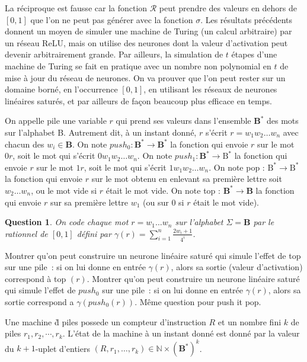 \documentclass[10pt]{article}
\newtheorem{question}{Question}
\begin{document}
La réciproque est fausse car la fonction $\mathcal{R}$ peut prendre des valeurs en dehors de $[0,1]$ que l'on ne peut pas générer avec la fonction $\sigma$. Les résultats précédents donnent un moyen de simuler une machine de Turing (un calcul arbitraire) par un réseau ReLU, mais on utilise des neurones dont la valeur d'activation peut devenir arbitrairement grande. Par ailleurs, la simulation de $t$ étapes d'une machine de Turing se fait en pratique avec un nombre non polynomial en $t$ de mise à jour du réseau de neurones. On va prouver que l'on peut rester sur un domaine borné, en l'occurrence $[0,1]$, en utilisant les réseaux de neurones linéaires saturés, et par ailleurs de façon beaucoup plus efficace en temps.

On appelle pile une variable $r$ qui prend ses valeurs dans l'ensemble $\mathbf{B}^{*}$ des mots sur l'alphabet B. Autrement dit, à un instant donné, $r$ s'écrit $r=w_{1} w_{2} \ldots w_{n}$ avec chacun des $w_{i} \in \mathbf{B}$. On note $p u s h_{0}: \mathbf{B}^{*} → \mathbf{B}^{*}$ la fonction qui envoie $r$ sur le mot $0 r$, soit le mot qui s'écrit $0 w_{1} w_{2} \ldots w_{n}$. On note $p u s h_{1}: \mathbf{B}^{*} → \mathrm{B}^{*}$ la fonction qui envoie $r$ sur le mot $1 r$, soit le mot qui s'écrit $1 w_{1} w_{2} \ldots w_{n}$. On note pop : $\mathrm{B}^{*} → \mathrm{B}^{*}$ la fonction qui envoie $r$ sur le mot obtenu en enlevant sa première lettre soit $w_{2} \ldots w_{n}$, ou le mot vide si $r$ était le mot vide. On note top : $\mathbf{B}^{*} → \mathbf{B}$ la fonction qui envoie $r$ sur sa première lettre $w_{1}$ (ou sur 0 si $r$ était le mot vide).

\begin{question}
	On code chaque mot $r=w_{1} \ldots w_{n}$ sur l'alphabet $Σ=\mathbf{B}$ par le rationnel de $[0,1]$ défini par $\gamma(r)=\sum_{i=1}^{n} \frac{2 w_{i}+1}{4^{i}}$.
\end{question}

Montrer qu'on peut construire un neurone linéaire saturé qui simule l'effet de top sur une pile : si on lui donne en entrée $\gamma(r)$, alors sa sortie (valeur d'activation) correspond à top $(r)$. Montrer qu'on peut construire un neurone linéaire saturé qui simule l'effet de $p u s h_{0}$ sur une pile : si on lui donne en entrée $\gamma(r)$, alors sa sortie correspond a $\gamma\left(p u s h_{0}(r)\right)$. Même question pour push it pop.

Une machine d̀ piles possede un compteur d'instruction $R$ et un nombre fini $k$ de piles $r_{1}, r_{2}, \cdots, r_{k}$. L'état de la machine à un instant donné est donné par la valeur du $k+1$-uplet d'entiers $\left(R, r_{1}, \ldots, r_{k}\right) \in \mathbb{N} \times\left(\mathbf{B}^{*}\right)^{k}$.
\end{document}
